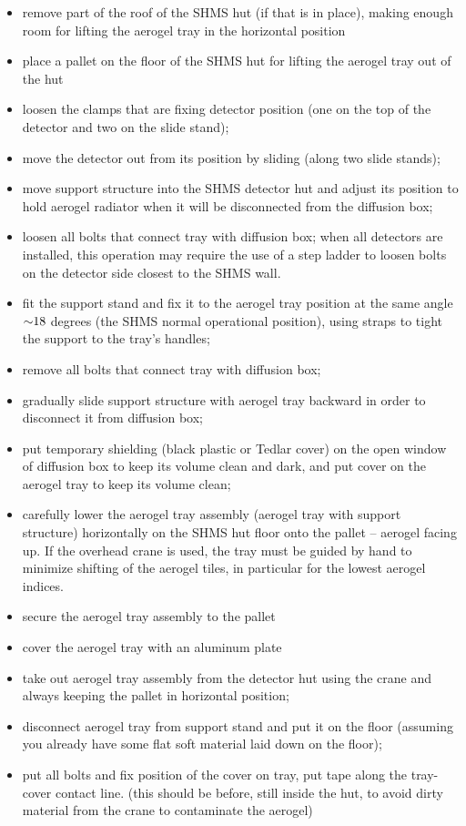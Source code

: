\begin{itemize}
  \item remove part of the roof of the SHMS hut (if that is in place),
    making enough room for lifting the aerogel tray in the horizontal
    position
  \item place a pallet on the floor of the SHMS hut for lifting the
    aerogel tray out of the hut
  \item loosen the clamps that are fixing detector position (one on
    the top of the detector and two on the slide stand);
  \item move the detector out from its position by sliding (along two
    slide stands);
  \item move support structure into the SHMS detector hut and adjust
    its position to hold aerogel radiator when it will be disconnected
    from the diffusion box;
  \item loosen all bolts that connect tray with diffusion box; when
    all detectors are installed, this operation may require the use of
    a step ladder to loosen bolts on the detector side closest to the
    SHMS wall.
  \item fit the support stand and fix it to the aerogel tray position
    at the same angle $\mathord{\sim} 18$ degrees (the SHMS normal operational
    position), using straps to tight the support to the tray's
    handles;
  \item remove all bolts that connect tray with diffusion box;
  \item gradually slide support structure with aerogel tray backward
    in order to disconnect it from diffusion box;
  \item put temporary shielding (black plastic or Tedlar cover) on the
    open window of diffusion box to keep its volume clean and dark,
    and put cover on the aerogel tray to keep its volume clean;
  \item carefully lower the aerogel tray assembly (aerogel tray with
    support structure) horizontally on the SHMS hut floor onto the
    pallet – aerogel facing up. If the overhead crane is used, the
    tray must be guided by hand to minimize shifting of the aerogel
    tiles, in particular for the lowest aerogel indices.
  \item secure the aerogel tray assembly to the pallet
  \item cover the aerogel tray with an aluminum plate
  \item take out aerogel tray assembly from the detector hut using the
    crane and always keeping the pallet in horizontal position;
  \item disconnect aerogel tray from support stand and put it on the
    floor (assuming you already have some flat soft material laid down
    on the floor);
  \item put all bolts and fix position of the cover on tray, put tape
    along the tray-cover contact line. (this should be before, still
    inside the hut, to avoid dirty material from the crane to
    contaminate the aerogel)
\end{itemize}

